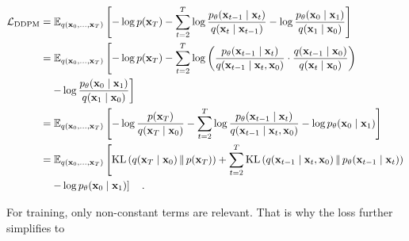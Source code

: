 \begin{align}
\mathcal{L}_{\text{DDPM}} 
&= \mathbb{E}_{q(\mathbf{x}_0,\dots,\mathbf{x}_T)} \left[ 
    -\log p(\mathbf{x}_T) 
    - \sum_{t=2}^T \log \frac{p_\theta(\mathbf{x}_{t-1} \mid \mathbf{x}_t)}{q(\mathbf{x}_t \mid \mathbf{x}_{t-1})} 
    - \log \frac{p_\theta(\mathbf{x}_0 \mid \mathbf{x}_1)}{q(\mathbf{x}_1 \mid \mathbf{x}_0)} 
\right] \\
&= \mathbb{E}_{q(\mathbf{x}_0,\dots,\mathbf{x}_T)} \left[ 
    -\log p(\mathbf{x}_T) 
    - \sum_{t=2}^T \log \left( 
        \frac{p_\theta(\mathbf{x}_{t-1} \mid \mathbf{x}_t)}{q(\mathbf{x}_{t-1} \mid \mathbf{x}_t, \mathbf{x}_0)} 
        \cdot 
        \frac{q(\mathbf{x}_{t-1} \mid \mathbf{x}_0)}{q(\mathbf{x}_t \mid \mathbf{x}_0)} 
    \right)
    \right. \notag \\
&\quad \left.
    - \log \frac{p_\theta(\mathbf{x}_0 \mid \mathbf{x}_1)}{q(\mathbf{x}_1 \mid \mathbf{x}_0)} 
\right] \\
&= \mathbb{E}_{q(\mathbf{x}_0,\dots,\mathbf{x}_T)} \left[ 
    -\log \frac{p(\mathbf{x}_T)}{q(\mathbf{x}_T \mid \mathbf{x}_0)} 
    - \sum_{t=2}^T \log \frac{p_\theta(\mathbf{x}_{t-1} \mid \mathbf{x}_t)}{q(\mathbf{x}_{t-1} \mid \mathbf{x}_t, \mathbf{x}_0)}  - \log p_\theta(\mathbf{x}_0 \mid \mathbf{x}_1) 
\right] \\
&= \mathbb{E}_{q(\mathbf{x}_0,\dots,\mathbf{x}_T)} \left[ 
    \text{KL} \left( q(\mathbf{x}_T \mid \mathbf{x}_0) \,\|\, p(\mathbf{x}_T) \right) 
    + \sum_{t=2}^T \text{KL} \left( q(\mathbf{x}_{t-1} \mid \mathbf{x}_t, \mathbf{x}_0) \,\|\, p_\theta(\mathbf{x}_{t-1} \mid \mathbf{x}_t) \right) 
\right. \notag \\
&\quad \left. 
    - \log p_\theta(\mathbf{x}_0 \mid \mathbf{x}_1) 
\right] \quad.
\end{align}


For training, only non-constant terms are relevant. That is why the loss further simplifies to

